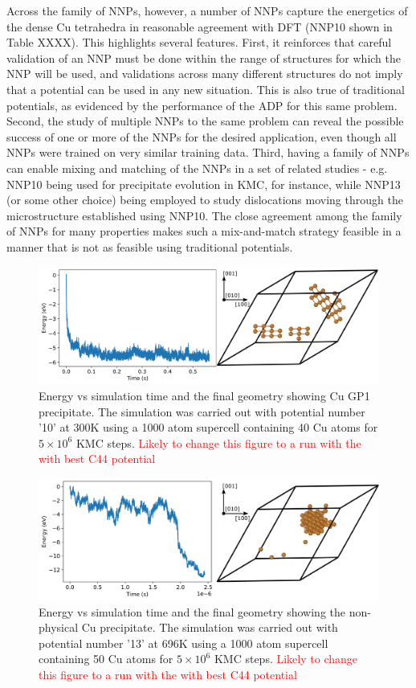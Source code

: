 \documentclass{article}
\begin{document}
Across the family of NNPs, however, a number of NNPs capture the energetics of the dense Cu tetrahedra in reasonable agreement with DFT (NNP10 shown in Table XXXX).   This highlights several features.  First, it reinforces that careful validation of an NNP must be done within the range of structures for which the NNP will be used, and validations across many different structures do not imply that a potential can be used in any new situation.  This is also true of traditional potentials, as evidenced by the performance of the ADP for this same problem.  Second, the study of multiple NNPs to the same problem can reveal the possible success of one or more of the NNPs for the desired application, even though all NNPs were trained on very similar training data.  Third, having a family of NNPs can enable mixing and matching of the NNPs in a set of related studies - e.g. NNP10 being used for precipitate evolution in KMC, for instance, while NNP13 (or some other choice) being employed to study dislocations moving through the microstructure established using NNP10.  The close agreement among the family of NNPs for many properties makes such a mix-and-match strategy feasible in a manner that is not as feasible using traditional potentials.


\begin{figure}[H]
  \centering
  \includegraphics[width=6.5in]{kmcFigures/gp1.pdf}
  \caption{Energy vs simulation time and the final geometry showing Cu GP1 precipitate. The simulation was carried out with potential number '10' at 300K using a 1000 atom supercell containing 40 Cu atoms for $5\times10^6$ KMC steps.
  \textcolor{red}{Likely to change this figure to a run with the with best C44 potential}
  }
  \label{fig:gp1}
\end{figure}

\begin{figure}[H]
  \centering
  \includegraphics[width=6.5in]{kmcFigures/cubulk.pdf}
  \caption{Energy vs simulation time and the final geometry showing the non-physical Cu precipitate. The simulation was carried out with potential number '13' at 696K using a 1000 atom supercell containing 50 Cu atoms for $5\times10^6$ KMC steps.
  \textcolor{red}{Likely to change this figure to a run with the with best C44 potential}
  }
  \label{fig:cubulk}
\end{figure}
\end{document}
